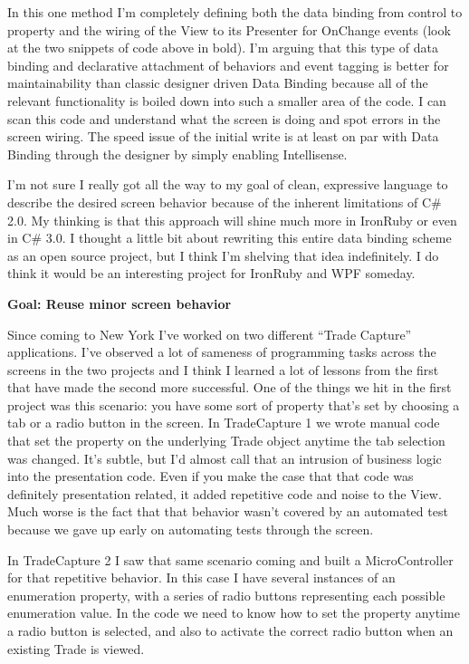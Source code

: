 \documentclass{article}
\begin{document}
{In this one method I'm completely defining both the data binding from control to property and the wiring of the View to its Presenter for OnChange events (look at the two snippets of code above in bold).  I'm arguing that this type of data binding and declarative attachment of behaviors and event tagging is better for maintainability than classic designer driven Data Binding because all of the relevant functionality is boiled down into such a smaller area of the code.  I can scan this code and understand what the screen is doing and spot errors in the screen wiring.  The speed issue of the initial write is at least on par with Data Binding through the designer by simply enabling Intellisense.

I'm not sure I really got all the way to my goal of clean, expressive language to describe the desired screen behavior because of the inherent limitations of C\# 2.0.  My thinking is that this approach will shine much more in IronRuby or even in C\# 3.0.  I thought a little bit about rewriting this entire data binding scheme as an open source project, but I think I'm shelving that idea indefinitely.  I do think it would be an interesting project for IronRuby and WPF someday.

\Large {\textbf{Goal:  Reuse minor screen behavior}}

Since coming to New York I've worked on two different “Trade Capture” applications.  I've observed a lot of sameness of programming tasks across the screens in the two projects and I think I learned a lot of lessons from the first that have made the second more successful.  One of the things we hit in the first project was this scenario:  you have some sort of property that's set by choosing a tab or a radio button in the screen.  In TradeCapture 1 we wrote manual code that set the property on the underlying Trade object anytime the tab selection was changed.  It's subtle, but I'd almost call that an intrusion of business logic into the presentation code.  Even if you make the case that that code was definitely presentation related, it added repetitive code and noise to the View.  Much worse is the fact that that behavior wasn't covered by an automated test because we gave up early on automating tests through the screen.

In TradeCapture 2 I saw that same scenario coming and built a MicroController for that repetitive behavior.  In this case I have several instances of an enumeration property, with a series of radio buttons representing each possible enumeration value.  In the code we need to know how to set the property anytime a radio button is selected, and also to activate the correct radio button when an existing Trade is viewed.

}
\end{document}
